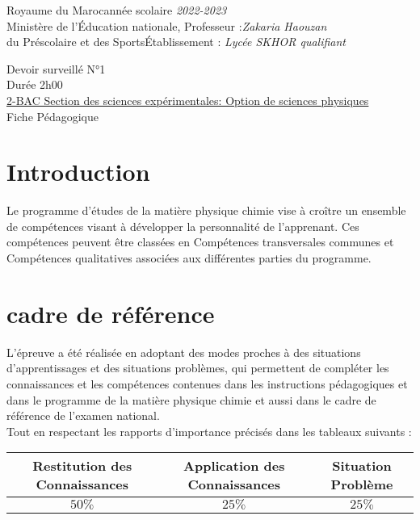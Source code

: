 \documentclass[12pt]{article}
\newcommand\headerMe[2]{\noindent{}#1\hfill#2}
\begin{document}
\headerMe{Royaume du Maroc}{année scolaire \emph{2022-2023}}\\
\headerMe{Ministère de l'Éducation nationale, }{  Professeur :\emph{Zakaria Haouzan}}\\
\headerMe{du Préscolaire et des Sports}{Établissement : \emph{Lycée SKHOR qualifiant}}\\

\begin{center}
Devoir surveillé N°1 \\
Durée 2h00\\
\underline{2-BAC Section des sciences expérimentales: Option de sciences physiques}\\

    \vspace{.2cm}
\hrulefill
\Large{Fiche Pédagogique}
\hrulefill\\
\end{center}


\section[A]{Introduction }
\hspace{0.5cm}Le programme d'études de la matière physique chimie vise à croître un ensemble de compétences visant à développer la personnalité de l'apprenant. Ces compétences peuvent être classées en Compétences transversales communes et Compétences qualitatives associées aux différentes parties du programme.
\section{cadre de référence }
 \hspace{0.5cm}L'épreuve a été réalisée en adoptant des modes proches à des situations d'apprentissages et des situations problèmes, qui permettent de compléter les connaissances et les compétences contenues dans les instructions pédagogiques et dans le programme de la matière physique chimie et aussi dans le cadre de référence de l'examen national. 
 \\Tout en respectant les rapports d'importance précisés dans les tableaux suivants :
 \begin{center}
\begin{tabular}{|c||c||c|}
\hline
    \textbf{Restitution des Connaissances} & \textbf{Application des Connaissances} & \textbf{Situation Problème }\\
    \hline 
    $50\%$ & $25\%$ & $25\%$\\
    \hline
\end{tabular} 
\end{center}
\end{document}
